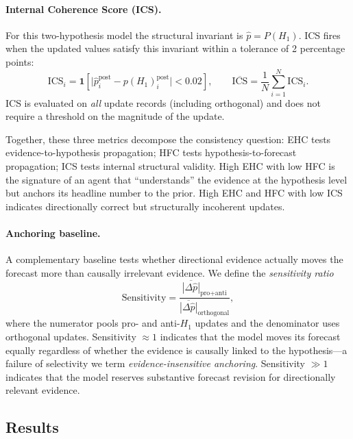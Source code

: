 \paragraph{Internal Coherence Score (ICS).}
For this two-hypothesis model the structural invariant is $\hat{p} = P(H_1)$.  ICS fires when
the updated values satisfy this invariant within a tolerance of 2 percentage points:
\begin{equation}
    \text{ICS}_i = \mathbf{1}\!\left[\bigl|\hat{p}_i^{\text{post}} - p(H_1)_i^{\text{post}}\bigr| < 0.02\right],
    \qquad
    \overline{\text{ICS}} = \frac{1}{N}\sum_{i=1}^{N} \text{ICS}_i.
    \label{eq:ics}
\end{equation}
ICS is evaluated on \emph{all} update records (including orthogonal) and does not require a
threshold on the magnitude of the update.

Together, these three metrics decompose the consistency question: EHC tests evidence-to-hypothesis
propagation; HFC tests hypothesis-to-forecast propagation; ICS tests internal structural validity.
High EHC with low HFC is the signature of an agent that ``understands'' the evidence at the
hypothesis level but anchors its headline number to the prior.  High EHC and HFC with low ICS
indicates directionally correct but structurally incoherent updates.

\paragraph{Anchoring baseline.}
A complementary baseline tests whether directional evidence actually moves the forecast more than
causally irrelevant evidence.  We define the \emph{sensitivity ratio}
\begin{equation}
    \text{Sensitivity} = \frac{\overline{|\Delta\hat{p}|}_{\text{pro}+\text{anti}}}
                              {\overline{|\Delta\hat{p}|}_{\text{orthogonal}}},
    \label{eq:sensitivity}
\end{equation}
where the numerator pools pro- and anti-$H_1$ updates and the denominator uses orthogonal updates.
Sensitivity $\approx 1$ indicates that the model moves its forecast equally regardless of whether
the evidence is causally linked to the hypothesis---a failure of selectivity we term
\emph{evidence-insensitive anchoring}.  Sensitivity $\gg 1$ indicates that the model reserves
substantive forecast revision for directionally relevant evidence.

\subsection{Results}

